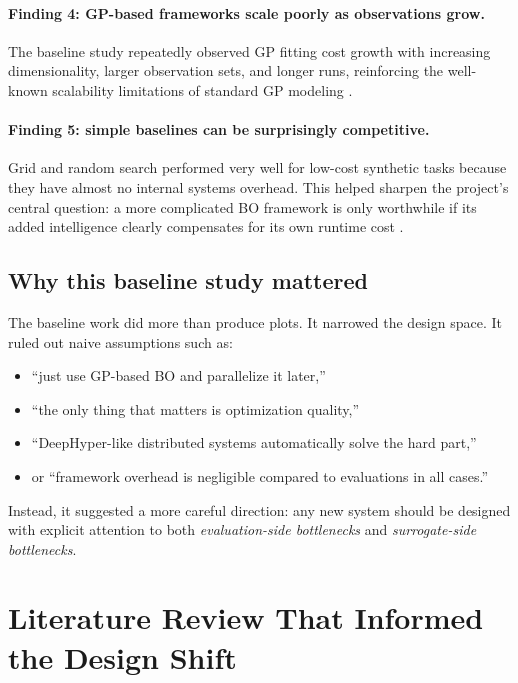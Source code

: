 \documentclass[11pt]{article}
\begin{document}
\paragraph{Finding 4: GP-based frameworks scale poorly as observations grow.}
The baseline study repeatedly observed GP fitting cost growth with increasing dimensionality, larger observation sets, and longer runs, reinforcing the well-known scalability limitations of standard GP modeling \cite{oumer2026baseline, wilson2015kissgp}.

\paragraph{Finding 5: simple baselines can be surprisingly competitive.}
Grid and random search performed very well for low-cost synthetic tasks because they have almost no internal systems overhead. This helped sharpen the project’s central question: a more complicated BO framework is only worthwhile if its added intelligence clearly compensates for its own runtime cost \cite{oumer2026baseline}.

\subsection{Why this baseline study mattered}

The baseline work did more than produce plots. It narrowed the design space. It ruled out naive assumptions such as:
\begin{itemize}[leftmargin=1.5em]
    \item ``just use GP-based BO and parallelize it later,''
    \item ``the only thing that matters is optimization quality,''
    \item ``DeepHyper-like distributed systems automatically solve the hard part,''
    \item or ``framework overhead is negligible compared to evaluations in all cases.''
\end{itemize}

Instead, it suggested a more careful direction: any new system should be designed with explicit attention to both \emph{evaluation-side bottlenecks} and \emph{surrogate-side bottlenecks}.

\section{Literature Review That Informed the Design Shift}
\end{document}
